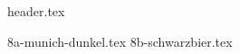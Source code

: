 \clearpage
{}
\divisorLine

{header.tex}

\begin{multicols}{2}

{8a-munich-dunkel.tex}
{8b-schwarzbier.tex}

\end{multicols}
